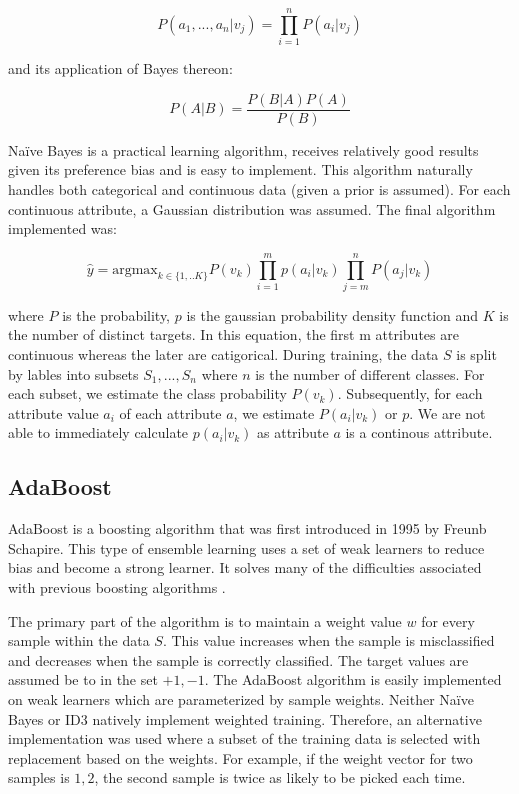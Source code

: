 \documentclass[11pt]{article}
\begin{document}
$$P(a_1,...,a_n|v_j) = \prod_{i=1}^{n}P(a_i|v_j)$$

and its application of Bayes thereon:

$$P(A|B) = \frac{P(B|A)P(A)}{P(B)}$$

Naïve Bayes is a practical learning algorithm, receives relatively good results given its preference bias and is easy to implement. This algorithm naturally handles both categorical and continuous data (given a prior is assumed). For each continuous attribute, a Gaussian distribution was assumed. The final algorithm implemented was:

$$\hat{y}= \mathrm{argmax}_{k\in\{1,..K\}} P(v_k)\prod_{i=1}^mp\left(a_i|v_k\right)\prod_{j=m}^nP\left(a_j|v_k\right)$$

where $P$ is the probability, $p$ is the gaussian probability density function and $K$ is the number of distinct targets. In this equation, the first m attributes are continuous whereas the later are catigorical. During training, the data $S$ is split by lables into subsets ${S_1,...,S_n}$ where $n$ is the number of different classes. For each subset, we estimate the class probability $P(v_k)$. Subsequently, for each attribute value $a_i$ of each attribute $a$, we estimate $P(a_i|v_k)$ or $p$. We are not able to immediately calculate $p(a_i|v_k)$ as attribute $a$ is a continous attribute.

\subsection{AdaBoost} \label{adaboost}
AdaBoost is a boosting algorithm that was first introduced in 1995 by Freunb Schapire. This type of ensemble learning uses a set of weak learners to reduce bias and become a strong learner. It solves many of the difficulties associated with previous boosting algorithms \cite{Schapire:1999:BIB:1624312.1624417}.

The primary part of the algorithm is to maintain a weight value $w$ for every sample within the data $S$. This value increases when the sample is misclassified and decreases when the sample is correctly classified. The target values are assumed be to in the set ${+1, -1}$. The AdaBoost algorithm is easily implemented on weak learners which are parameterized by sample weights. Neither Naïve Bayes or ID3 natively implement weighted training. Therefore, an alternative implementation was used where a subset of the training data is selected with replacement based on the weights. For example, if the weight vector for two samples is ${1, 2}$, the second sample is twice as likely to be picked each time.
\end{document}
